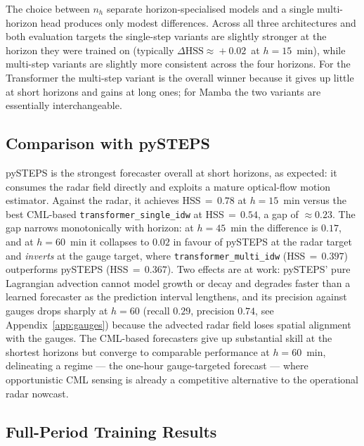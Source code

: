\documentclass[12pt, a4paper]{article}
\begin{document}
The choice between $n_h$ separate horizon-specialised models and a
single multi-horizon head produces only modest differences. Across
all three architectures and both evaluation targets the single-step
variants are slightly stronger at the horizon they were trained on
(typically $\Delta\text{HSS}\!\approx\!+0.02$~at $h\!=\!15$~min),
while multi-step variants are slightly more consistent across the
four horizons. For the Transformer the multi-step variant is the
overall winner because it gives up little at short horizons and gains
at long ones; for Mamba the two variants are essentially
interchangeable.

\subsection{Comparison with pySTEPS}\label{sec:results:pysteps}

pySTEPS is the strongest forecaster overall at short horizons, as
expected: it consumes the radar field directly and exploits a mature
optical-flow motion estimator. Against the radar, it achieves
HSS$\,=\,0.78$ at $h\!=\!15$~min versus the best CML-based
\texttt{transformer\_single\_idw} at HSS$\,=\,0.54$, a gap of
$\approx 0.23$. The gap narrows monotonically with horizon: at
$h\!=\!45$~min the difference is $0.17$, and at $h\!=\!60$~min it
collapses to $0.02$ in favour of pySTEPS at the radar target and
\emph{inverts} at the gauge target, where
\texttt{transformer\_multi\_idw} (HSS$\,=\,0.397$) outperforms
pySTEPS (HSS$\,=\,0.367$). Two effects are at work: pySTEPS' pure
Lagrangian advection cannot model growth or decay and degrades faster
than a learned forecaster as the prediction interval lengthens, and
its precision against gauges drops sharply at $h\!=\!60$ (recall
$0.29$, precision $0.74$, see Appendix~\ref{app:gauges}) because the
advected radar field loses spatial alignment with the gauges. The
CML-based forecasters give up substantial skill at the shortest
horizons but converge to comparable performance at $h\!=\!60$~min,
delineating a regime --- the one-hour gauge-targeted forecast --- where
opportunistic CML sensing is already a competitive alternative to the
operational radar nowcast.

\subsection{Full-Period Training Results}\label{sec:results:fullperiod}
\end{document}
